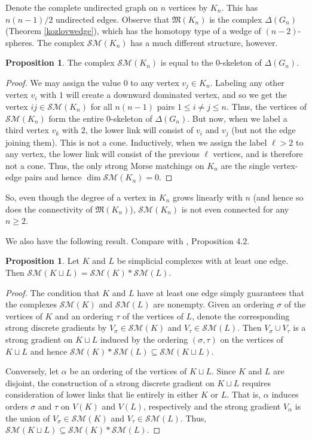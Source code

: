 \documentclass{amsart}
\theoremstyle{definition}
\newtheorem{proposition}[theorem]{Proposition}
\newcommand{\sm}{{\mathcal{SM}}}
\begin{document}
Denote the complete undirected graph on $n$ vertices by $K_n$. This has $n(n-1)/2$ undirected edges. Observe that ${\mathfrak M}(K_n)$ is the complex $\Delta(G_n)$ (Theorem \ref{kozlovwedge}), which has the homotopy type of a wedge of $(n-2)$-spheres. The complex $\sm(K_n)$ has a much different structure, however.

\begin{proposition}\label{completestrong}
    The complex $\sm(K_n)$ is equal to the $0$-skeleton of $\Delta(G_n)$.
\end{proposition}

\begin{proof}
    We may assign the value $0$ to any vertex $v_j\in K_n$. Labeling any other vertex $v_i$ with $1$ will create a downward dominated vertex, and so we get the vertex $ij\in \sm(K_n)$ for all $n(n-1)$ pairs $1\le i\ne j\le n$. Thus, the vertices of $\sm(K_n)$ form the entire $0$-skeleton of $\Delta(G_n)$. But now, when we label a third vertex $v_k$ with $2$, the lower link will consist of $v_i$ and $v_j$ (but not the edge joining them). This is not a cone. Inductively, when we assign the label $\ell>2$ to any vertex, the lower link will consist of the previous $\ell$ vertices, and is therefore not a cone. Thus, the only strong Morse matchings on $K_n$ are the single vertex-edge pairs and hence $\dim\sm(K_n)=0$. 
\end{proof}

So, even though the degree of a vertex in $K_n$ grows linearly with $n$ (and hence so does the connectivity of ${\mathfrak M}(K_n)$), $\sm(K_n)$ is not even connected for any $n\ge 2$.

We also have the following result. Compare with \cite{DonovonLinScoville2023}, Proposition 4.2.

\begin{proposition}\label{disjointunion}
    Let $K$ and $L$ be simplicial complexes with at least one edge. Then $\sm(K\sqcup L) = \sm(K)\ast\sm(L)$.
\end{proposition}

\begin{proof}
    The condition that $K$ and $L$ have at least one edge simply guarantees that the complexes $\sm(K)$ and $\sm(L)$ are nonempty. Given an ordering $\sigma$ of the vertices of $K$ and an ordering $\tau$ of the vertices of $L$, denote the corresponding strong discrete gradients by $V_\sigma\in\sm(K)$ and $V_\tau\in\sm(L)$. Then $V_\sigma\cup V_\tau$ is a strong gradient on $K\sqcup L$ induced by the ordering $(\sigma,\tau)$ on the vertices of $K\sqcup L$ and hence $\sm(K)\ast\sm(L)\subseteq\sm(K\sqcup L)$.

    Conversely, let $\alpha$ be an ordering of the vertices of $K\sqcup L$. Since $K$ and $L$ are disjoint, the construction of a strong discrete gradient on $K\sqcup L$ requires consideration of lower links that lie entirely in either $K$ or $L$. That is, $\alpha$ induces orders $\sigma$ and $\tau$ on $V(K)$ and $V(L)$, respectively and the strong gradient $V_\alpha$ is the union of $V_\sigma\in\sm(K)$ and $V_\tau\in\sm(L)$. Thus, $\sm(K\sqcup L)\subseteq \sm(K)\ast\sm(L)$.
\end{proof}
\end{document}
